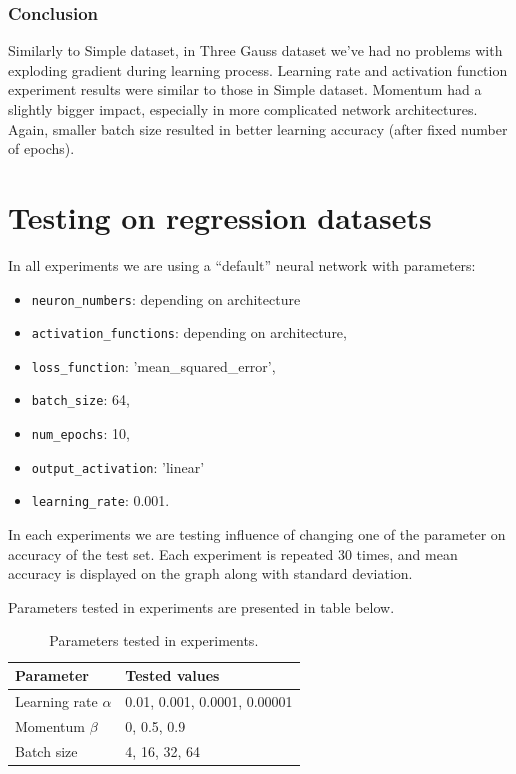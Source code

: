 \documentclass[a4]{article}
\begin{document}
\newpage
\subsubsection{Conclusion}
Similarly to Simple dataset, in Three Gauss dataset we've had no problems with exploding gradient during learning process. Learning rate and activation function experiment results were similar to those in Simple dataset. Momentum had a slightly bigger impact, especially in more complicated network architectures. Again, smaller batch size resulted in better learning accuracy (after fixed number of epochs).







\newpage
\section{Testing on regression datasets}
In all experiments we are using a ``default'' neural network with parameters:
\begin{itemize}
    \item \texttt{neuron\_numbers}: depending on architecture
    \item \texttt{activation\_functions}: depending on architecture,
    \item \texttt{loss\_function}: 'mean\_squared\_error',
    \item \texttt{batch\_size}: 64,
    \item \texttt{num\_epochs}: 10,
    \item \texttt{output\_activation}: 'linear'
    \item \texttt{learning\_rate}: 0.001.
\end{itemize}
In each experiments we are testing influence of changing one of the parameter on accuracy of the test set. Each experiment is repeated 30 times, and mean accuracy is displayed on the graph along with standard deviation. 

Parameters tested in experiments are presented in table below. 

\bgroup
\def\arraystretch{1.5}
\begin{table}[!h]
    \centering
    \begin{tabular}{ll}
        Parameter              & Tested values \\ \hline
        Learning rate $\alpha$ &    0.01, 0.001, 0.0001, 0.00001           \\
        Momentum $\beta$       &    0, 0.5, 0.9           \\
        Batch size             &    4, 16, 32, 64       
    \end{tabular}
    \caption{Parameters tested in experiments.}
\end{table}
\egroup
\end{document}
